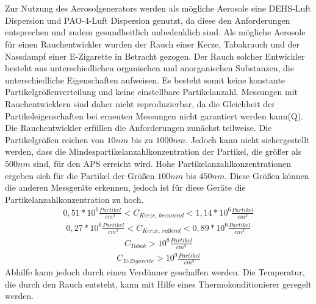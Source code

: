 \\\\
Zur Nutzung des Aerosolgenerators werden als m\"{o}gliche Aerosole eine DEHS-Luft Dispersion und PAO-4-Luft Dispersion genutzt, da diese den Anforderungen entsprechen und zudem gesundheitlich unbedenklich sind. Als m\"{o}gliche Aerosole f\"{u}r einen Rauchentwickler wurden der Rauch einer Kerze, Tabakrauch und der Nassdampf einer E-Zigarette in Betracht gezogen. Der Rauch solcher Entwickler besteht aus unterschiedlichen organischen und anorganischen Substanzen, die unterschiedliche Eigenschaften aufweisen. Es besteht somit keine konstante Partikelgr\"{o}{\ss}enverteilung und keine einstellbare Partikelanzahl. Messungen mit Rauchentwicklern sind daher nicht reproduzierbar, da die Gleichheit der Partikeleigenschaften bei erneuten Messungen nicht garantiert werden kann(Q). Die Rauchentwickler erf\"{u}llen die Anforderungen zun\"{a}chst teilweise. Die Partikelgr\"{o}{\ss}en reichen von \(10 nm\) bis zu \(1000 nm\). Jedoch kann nicht sichergestellt werden, dass die Mindespartikelanzahlkonzentration der Partikel, die gr\"{o}{\ss}er als \(500 nm\) sind, f\"{u}r den APS erreicht wird. Hohe Partikelanzahlkonzentrationen ergeben sich f\"{u}r die Partikel der Gr\"{o}{\ss}en \(100 nm\) bis \(450 nm\). Diese Gr\"{o}{\ss}en k\"{o}nnen die anderen Messger\"{a}te erkennen, jedoch ist f\"{u}r diese Ger\"{a}te die Partikelanzahlkonzentration zu hoch.
\begin{align*}
0,51 * 10^6 \frac{\textit{Partikel}}{cm^3} < C_\textit{Kerze, brennend} < 1,14 * 10^6 \frac{\textit{Partikel}}{cm^3}
\end{align*}
\begin{align*}
0,27 * 10^6 \frac{\textit{Partikel}}{cm^3} < C_\textit{Kerze, ru{\ss}end} < 0,89 * 10^6 \frac{\textit{Partikel}}{cm^3}
\end{align*}
\begin{align*}
C_\textit{Tabak} > 10^8 \frac{\textit{Partikel}}{cm^3}
\end{align*}
\begin{align*}
C_\textit{E-Zigarette} > 10^9 \frac{\textit{Partikel}}{cm^3}
\end{align*}
Abhilfe kann jedoch durch einen Verd\"{u}nner geschaffen werden. Die Temperatur, die durch den Rauch entsteht, kann mit Hilfe eines Thermokonditionierer geregelt werden.
\\\\
